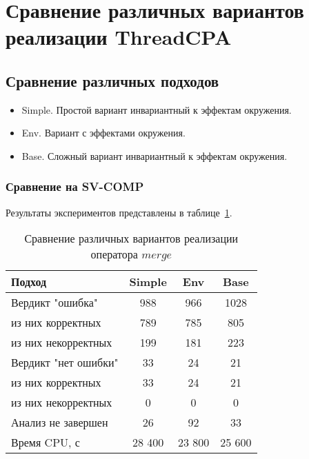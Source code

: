 
\section{Сравнение различных вариантов реализации ThreadCPA}

\subsection{Сравнение различных подходов }

\begin{itemize}
\item Simple. Простой вариант инвариантный к эффектам окружения.
\item Env. Вариант с эффектами окружения.
\item Base. Сложный вариант инвариантный к эффектам окружения.
\end{itemize}

\subsubsection{Сравнение на SV-COMP}
Результаты экспериментов представлены в таблице~\ref{table-svcomp-thread}.

\begin{center}
  \begin{table}[h]\footnotesize \centering
  	\label{table-svcomp-thread}
    \caption{Сравнение различных вариантов реализации оператора $merge$}
    \begin{tabular}{ | l | c | c | c | }
      \hline
      Подход         				& Simple   	& Env 		& Base  	\\ \hline
      Вердикт "ошибка" 				& 988    	& 966       & 1028       \\ 
  \hspace{0.5cm} из них корректных 	& 789 		& 785 		& 805    	\\ 
  \hspace{0.5cm} из них некорректных & 199 		& 181 		& 223     	\\ \hline
      Вердикт "нет ошибки"  		& 33      	& 24        & 21       	\\ 
  \hspace{0.5cm} из них корректных 	& 33 		& 24    	& 21      	\\
  \hspace{0.5cm} из них некорректных & 0 		& 0    		& 0     	\\ \hline
      Анализ не завершен       		& 26     	& 92        & 33    	\\ \hline
      Время CPU, с   				& 28 400 	& 23 800    & 25 600  	\\
      \hline
    \end{tabular}
  \end{table}
\end{center}

